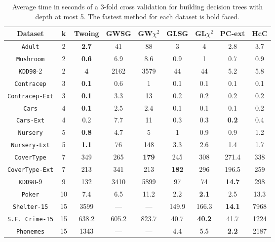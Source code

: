 \begin{table*}[]
\small
\centering
\caption{Average time in seconds of a 3-fold cross validation
for building decision trees with depth at most 5.
The fastest method for each dataset is bold faced.}
\begin{tabular}{c|c|c|c|c|c|c|c|c}
Dataset             & k  & Twoing     & GWSG  & GW$\chi^2$  & GLSG      & GL$\chi^2$ & PC-ext     & HcC        \\ \hline
{\tt Adult}         & 2  & {\bf  2.7} & 41    & 88          & 3         & 4          & 2.8        & 3.7        \\
{\tt Mushroom}      & 2  & {\bf 0.6}  & 6.9   & 8.6         & 0.9       & 1          & 0.7        & 0.9        \\
{\tt KDD98}-2       & 2  & {\bf 4}    & 2162  & 3579        & 44        & 44         & 5.2        & 5.8        \\
{\tt Contracep}     & 3  & {\bf 0.1}  & 0.6   & 1           & 0.1       & 0.1        & 0.1        & 0.1        \\
{\tt Contracep-Ext} & 3  & {\bf 0.1}  & 3.3   & 13          & 0.2       & 0.2        & 0.2        & 0.2        \\
{\tt Cars}          & 4  & {\bf 0.1}  & 2.5   & 2.4         & 0.1       & 0.1        & 0.1        & 0.2        \\
{\tt Cars-Ext}      & 4  & 0.2        & 7.7   & 11          & 0.3       & 0.3        & {\bf 0.2}  & 0.4        \\
{\tt Nursery}       & 5  & {\bf 0.8}  & 4.7   & 5           & 1         & 0.9        & 0.9        & 1.2        \\
{\tt Nursery-Ext}   & 5  & {\bf 1.1}  & 76    & 148         & 3.3       & 2.6        & 1.4        & 1.7        \\
{\tt CoverType}     & 7  & 349        & 265   & {\bf 179}   & 245       & 308        & 271.4      & 338        \\
{\tt CoverType-Ext} & 7  & 213        & 341   & 213         & {\bf 182} & 296        & 196.5      & 259        \\
{\tt KDD98}-9       & 9  & 132        & 3410  & 5899        & 97        & 74         & {\bf 14.7 }& 298        \\ 
{\tt Poker}         & 10 & 7.4        & 6.5   & 11.2        & 2.2       & {\bf 2.1}  & 2.5        & 13.3       \\
{\tt Shelter-15}    & 15 & 3599       & ---   & ---         & 149.9     & 166.3      & {\bf 14.1 }& 7968       \\   
{\tt S.F. Crime-15} & 15 & 638.2      & 605.2 & 823.7       & 40.7      & {\bf 40.2} & 41.7       & 1224       \\ 
{\tt Phonemes}      & 15 & 1343       & ---   & ---         & 4.4       & 5.5        & {\bf 2.2 } & 2187
\end{tabular}
\label{tab:time-5}
\end{table*}
